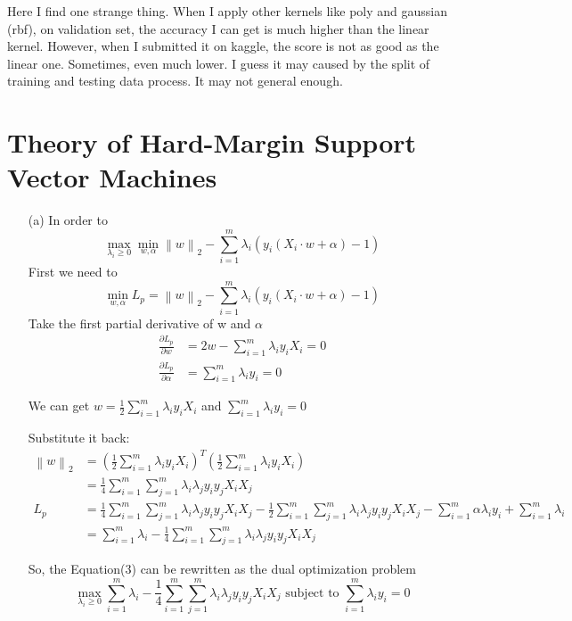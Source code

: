 \documentclass[a4paper,12pt]{article}
\begin{document}
Here I find one strange thing. When I apply other kernels like poly and gaussian (rbf), on validation set, the accuracy I can get is much higher than the linear kernel. However, when I submitted it on kaggle, the score is not as good as the linear one. Sometimes, even much lower. I guess it may caused by the split of training and testing data process. It may not general enough.

\clearpage

\section{Theory of Hard-Margin Support Vector Machines}
\begin{itemize}
\item[(a)]
In order to 
$$
\max \limits_{\lambda_i \ge 0}  \min \limits_{w,\alpha} \left\|w\right\|_2 - \sum_{i=1}^m \lambda_i (y_i (X_i \cdot w + \alpha) -1)
$$
First we need to
$$
\min \limits_{w,\alpha} L_p = \left\|w\right\|_2 - \sum_{i=1}^m \lambda_i (y_i (X_i \cdot w + \alpha) -1)
$$
Take the first partial derivative of w and $\alpha$
\begin{align*}
\frac{\partial L_p}{\partial w} &= 2 w - \sum_{i=1}^m \lambda_i y_i X_i = 0 \\
\frac{\partial L_p}{\partial \alpha} &= \sum_{i=1}^m \lambda_i y_i= 0
\end{align*}

We can get $w = \frac{1}{2} \sum_{i=1}^m \lambda_i y_i X_i $ and $\sum_{i=1}^m \lambda_i y_i = 0$

Substitute it back:
\begin{align*}
\left\|w\right\|_2 &= (\frac{1}{2} \sum_{i=1}^m \lambda_i y_i X_i)^T (\frac{1}{2} \sum_{i=1}^m \lambda_i y_i X_i)\\
				&= \frac{1}{4} \sum_{i=1}^m \sum_{j=1}^m  \lambda_i \lambda_j y_i y_j X_i X_j \\
			L_p &= \frac{1}{4} \sum_{i=1}^m \sum_{j=1}^m  \lambda_i \lambda_j y_i y_j X_i X_j  - \frac{1}{2} \sum_{i=1}^m \sum_{j=1}^m  \lambda_i \lambda_j y_i y_j X_i X_j -\sum_{i=1}^m \alpha \lambda_i y_i + \sum_{i=1}^m \lambda_i \\
			      &= \sum_{i=1}^m \lambda_i - \frac{1}{4} \sum_{i=1}^m \sum_{j=1}^m  \lambda_i \lambda_j y_i y_j X_i X_j 
\end{align*}

So, the Equation(3) can be rewritten as the dual optimization problem
$$
\max \limits_{\lambda_i \ge 0} \sum_{i=1}^m \lambda_i -\frac{1}{4} \sum_{i=1}^m \sum_{j=1}^m  \lambda_i \lambda_j y_i y_j X_i X_j  \text{  subject to }  \sum_{i=1}^m \lambda_i y_i= 0
$$


\end{itemize}
\end{document}
